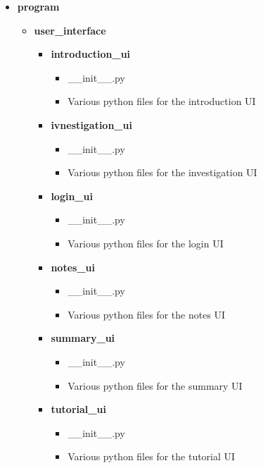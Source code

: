 \documentclass{article}
\begin{document}
\begin{itemize}
    \item \textbf{program}
    \begin{itemize}
        \item \textbf{user\_interface}
        \begin{itemize}
            \item \textbf{introduction\_ui}
            \begin{itemize}
                \item \_\_init\_\_.py
                \item Various python files for the introduction UI
            \end{itemize}
            \item \textbf{ivnestigation\_ui}
            \begin{itemize}
                \item \_\_init\_\_.py
                \item Various python files for the investigation UI
            \end{itemize}
            \item \textbf{login\_ui}
            \begin{itemize}
                \item \_\_init\_\_.py
                \item Various python files for the login UI
            \end{itemize}
            \item \textbf{notes\_ui}
            \begin{itemize}
                \item \_\_init\_\_.py
                \item Various python files for the notes UI
            \end{itemize}
            \item \textbf{summary\_ui}
            \begin{itemize}
                \item \_\_init\_\_.py
                \item Various python files for the summary UI
            \end{itemize}
            \item \textbf{tutorial\_ui}
            \begin{itemize}
                \item \_\_init\_\_.py
                \item Various python files for the tutorial UI

\end{itemize}
\end{itemize}
\end{itemize}
\end{itemize}
\end{document}
